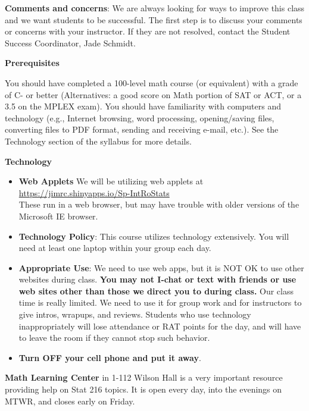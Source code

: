 {\bf Comments and concerns}: We are always looking for ways to improve
this class and we want students to be successful.  The first step is
to discuss your comments or concerns with your instructor.  If they
are not resolved, contact the Student Success Coordinator, Jade
Schmidt. 


\newpage
 
{\bf Prerequisites }
 
You should have completed  a 100-level math course (or equivalent) with
a grade of C- or better (Alternatives: a good score on Math portion
of SAT or ACT, or a 3.5 on the MPLEX exam).   
 You should have familiarity with computers and technology (e.g.,
Internet browsing, word processing, opening/saving files, converting
files to PDF format, sending and receiving e-mail, etc.). See the
Technology section of the syllabus for more details.  
 


{\bf Technology} \vspace{-.3in}
\begin{itemize}
\item {\bf Web Applets}  We will be utilizing web applets 
 at \url{https://jimrc.shinyapps.io/Sp-IntRoStats}\\
  These run in a web browser, but
  may have trouble with older versions of the Microsoft IE browser.
\item {\bf Technology Policy}:  This course utilizes technology
  extensively.  You will need at least one laptop within your group each
  day.
\item {\bf Appropriate Use}: We need to use web apps, but it is NOT OK
  to use other websites during class. {\bf You may not I-chat or text
    with friends or  use web sites other than those we direct you to
    during class.} Our class time is really limited. We need to use it
  for group work and for instructors to give intros, wrapups, and
  reviews.  Students who use technology inappropriately will lose
  attendance or RAT points for the day, and will have to  leave the
  room if they cannot stop such behavior.
\item {\bf Turn OFF your cell phone and put it away}.
\end{itemize}

{\bf Math Learning Center} in 1-112 Wilson Hall is a very important
resource providing  help on Stat 216 topics.
 It is open every day, into the evenings on MTWR, and closes early on
 Friday. 


